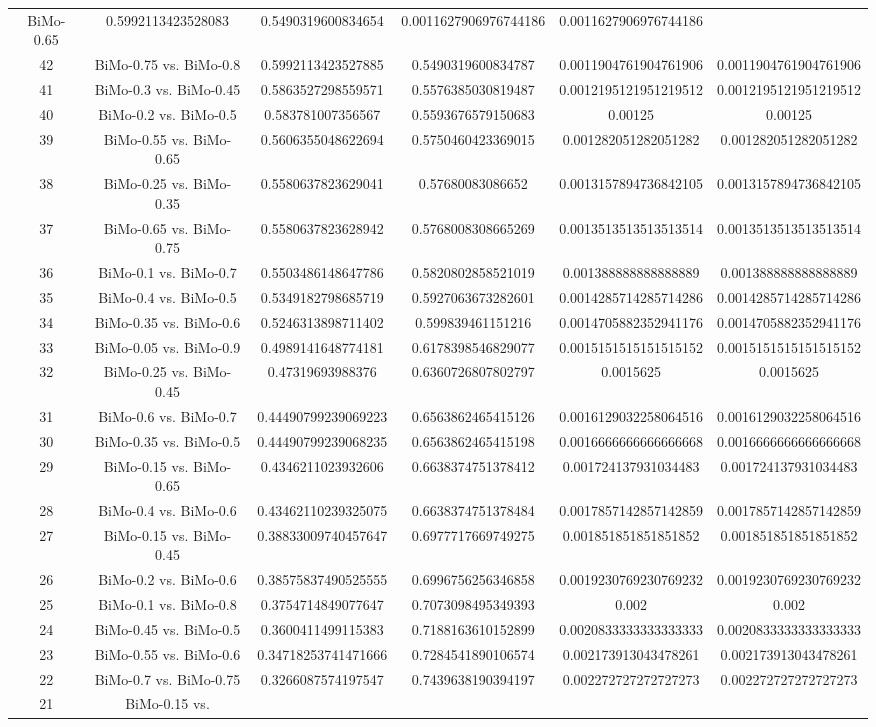 \documentclass[a4paper,10pt]{article}
\begin{document}
\begin{landscape}
\begin{table}[!htp]
\begin{tabular}{cccccc}
BiMo-0.65&0.5992113423528083&0.5490319600834654&0.0011627906976744186&0.0011627906976744186\\42&BiMo-0.75 vs. BiMo-0.8&0.5992113423527885&0.5490319600834787&0.0011904761904761906&0.0011904761904761906\\41&BiMo-0.3 vs. BiMo-0.45&0.5863527298559571&0.5576385030819487&0.0012195121951219512&0.0012195121951219512\\40&BiMo-0.2 vs. BiMo-0.5&0.583781007356567&0.5593676579150683&0.00125&0.00125\\39&BiMo-0.55 vs. BiMo-0.65&0.5606355048622694&0.5750460423369015&0.001282051282051282&0.001282051282051282\\38&BiMo-0.25 vs. BiMo-0.35&0.5580637823629041&0.57680083086652&0.0013157894736842105&0.0013157894736842105\\37&BiMo-0.65 vs. BiMo-0.75&0.5580637823628942&0.5768008308665269&0.0013513513513513514&0.0013513513513513514\\36&BiMo-0.1 vs. BiMo-0.7&0.5503486148647786&0.5820802858521019&0.001388888888888889&0.001388888888888889\\35&BiMo-0.4 vs. BiMo-0.5&0.5349182798685719&0.5927063673282601&0.0014285714285714286&0.0014285714285714286\\34&BiMo-0.35 vs. BiMo-0.6&0.5246313898711402&0.599839461151216&0.0014705882352941176&0.0014705882352941176\\33&BiMo-0.05 vs. BiMo-0.9&0.4989141648774181&0.6178398546829077&0.0015151515151515152&0.0015151515151515152\\32&BiMo-0.25 vs. BiMo-0.45&0.47319693988376&0.6360726807802797&0.0015625&0.0015625\\31&BiMo-0.6 vs. BiMo-0.7&0.44490799239069223&0.6563862465415126&0.0016129032258064516&0.0016129032258064516\\30&BiMo-0.35 vs. BiMo-0.5&0.44490799239068235&0.6563862465415198&0.0016666666666666668&0.0016666666666666668\\29&BiMo-0.15 vs. BiMo-0.65&0.4346211023932606&0.6638374751378412&0.001724137931034483&0.001724137931034483\\28&BiMo-0.4 vs. BiMo-0.6&0.43462110239325075&0.6638374751378484&0.0017857142857142859&0.0017857142857142859\\27&BiMo-0.15 vs. BiMo-0.45&0.38833009740457647&0.6977717669749275&0.001851851851851852&0.001851851851851852\\26&BiMo-0.2 vs. BiMo-0.6&0.38575837490525555&0.6996756256346858&0.0019230769230769232&0.0019230769230769232\\25&BiMo-0.1 vs. BiMo-0.8&0.3754714849077647&0.7073098495349393&0.002&0.002\\24&BiMo-0.45 vs. BiMo-0.5&0.3600411499115383&0.7188163610152899&0.0020833333333333333&0.0020833333333333333\\23&BiMo-0.55 vs. BiMo-0.6&0.34718253741471666&0.7284541890106574&0.002173913043478261&0.002173913043478261\\22&BiMo-0.7 vs. BiMo-0.75&0.3266087574197547&0.7439638190394197&0.002272727272727273&0.002272727272727273\\21&BiMo-0.15 vs. 
\end{tabular}
\end{table}
\end{landscape}
\end{document}
